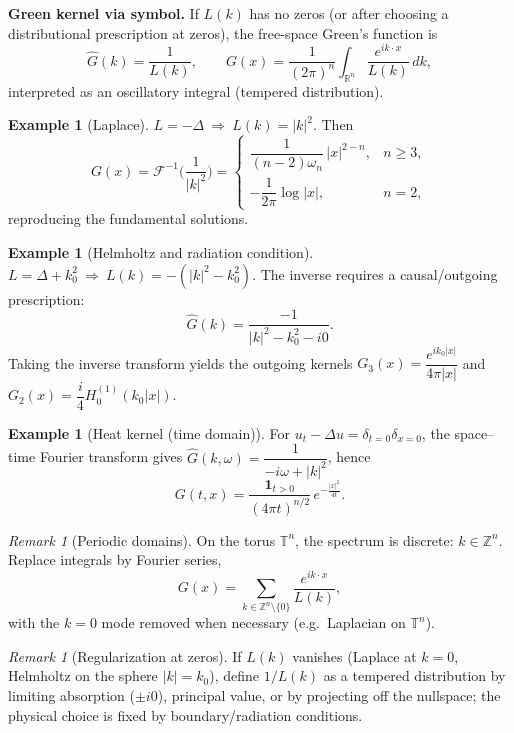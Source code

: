 \documentclass[11pt]{article}
\theoremstyle{definition}
\newtheorem{example}[theorem]{Example}
\theoremstyle{remark}
\newtheorem{remark}[theorem]{Remark}
\begin{document}
	\begin{tcolorbox}
		\textbf{Green kernel via symbol.}
		If $L(k)$ has no zeros (or after choosing a distributional prescription at zeros),
		the free-space Green's function is
		\[
		\widehat{G}(k)=\frac{1}{L(k)},\qquad
		G(x)=\frac{1}{(2\pi)^n}\int_{\mathbb{R}^n}\frac{e^{ik\cdot x}}{L(k)}\,dk,
		\]
		interpreted as an oscillatory integral (tempered distribution).
	\end{tcolorbox}
	
	\begin{example}[Laplace]
		$L=-\Delta\ \Rightarrow\ L(k)=|k|^2$. Then
		\[
		G(x)=\mathcal{F}^{-1}\!\Big(\frac{1}{|k|^2}\Big)=
		\begin{cases}
			\dfrac{1}{(n-2)\omega_n}\,|x|^{2-n}, & n\ge3,\\[8pt]
			-\dfrac{1}{2\pi}\log|x|, & n=2,
		\end{cases}
		\]
		reproducing the fundamental solutions.
	\end{example}
	
	\begin{example}[Helmholtz and radiation condition]
		$L=\Delta+k_0^2\ \Rightarrow\ L(k)=-(|k|^2-k_0^2)$. The inverse requires a causal/outgoing
		prescription:
		\[
		\widehat{G}(k)=\frac{-1}{|k|^2-k_0^2-i0}.
		\]
		Taking the inverse transform yields the outgoing kernels
		$G_3(x)=\dfrac{e^{ik_0|x|}}{4\pi|x|}$ and
		$G_2(x)=\dfrac{i}{4}H_0^{(1)}(k_0|x|)$.
	\end{example}
	
	\begin{example}[Heat kernel (time domain)]
		For $u_t-\Delta u=\delta_{t=0}\delta_{x=0}$, the space--time Fourier transform gives
		$\widehat{G}(k,\omega)=\dfrac{1}{-i\omega+|k|^2}$, hence
		\[
		G(t,x)=\frac{\mathbf{1}_{t>0}}{(4\pi t)^{n/2}}\,e^{-\frac{|x|^2}{4t}}.
		\]
	\end{example}
	
	\begin{remark}[Periodic domains]
		On the torus $\mathbb{T}^n$, the spectrum is discrete: $k\in\mathbb{Z}^n$. Replace integrals by
		Fourier series,
		\[
		G(x)=\sum_{k\in\mathbb{Z}^n\setminus\{0\}}\frac{e^{ik\cdot x}}{L(k)},
		\]
		with the $k=0$ mode removed when necessary (e.g.\ Laplacian on $\mathbb{T}^n$).
	\end{remark}
	
	\begin{remark}[Regularization at zeros]
		If $L(k)$ vanishes (Laplace at $k=0$, Helmholtz on the sphere $|k|=k_0$), define
		$1/L(k)$ as a tempered distribution by limiting absorption ($\pm i0$), principal value,
		or by projecting off the nullspace; the physical choice is fixed by boundary/radiation conditions.
	\end{remark}
	
\end{document}
